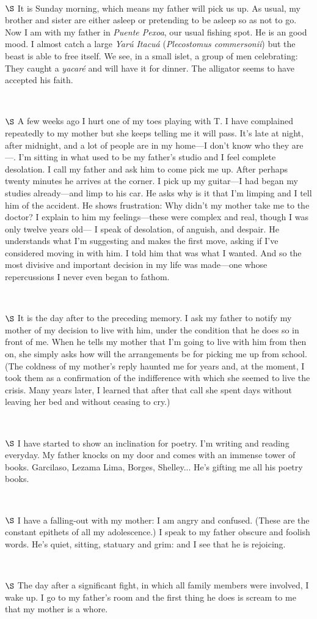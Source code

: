 \documentclass[a4paper, 12pt]{article}
\begin{document}
~

$\S$ It is Sunday morning, which means my father will pick us up. As usual, my
brother and sister are either asleep or pretending to be asleep so as not to
go. Now I am with my father in \textit{Puente Pexoa}, our usual
fishing spot. He is an good mood. I almost catch a large \textit{Yarú Itacuá}
(\textit{Plecostomus commersonii}) but the beast is able to free itself. We
see, in a small islet, a group of men celebrating: They caught a
\textit{yacaré} and will have it for dinner. The alligator seems to
have accepted his faith.

~ 

$\S$ A few weeks ago I hurt one of my toes playing with T. I have complained
repeatedly to my mother but she keeps telling me it will pass. It's late at
night, after midnight, and a lot of people are in my home---I don't know who
they are---. I'm sitting in what used to be my father's studio and I feel
complete desolation. I call my father and ask him to come pick me up. After
perhaps twenty minutes he arrives at the corner. I pick up
my guitar---I had began my studies already---and limp to his car. He asks why
is it that I'm limping and I tell him of the accident. He shows frustration: Why didn't my mother take me to the doctor? I explain to him my
feelings---these were complex and real, though I was only twelve years old--- I
speak of desolation, of anguish, and despair. He understands what I'm
suggesting and makes the first move, asking if I've considered moving in with
him. I told him that was what I wanted. And so the most divisive and important
decision in my life was made---one whose repercussions I never even began to
fathom.

~ 

$\S$ It is the day after to the preceding memory. I ask my father to notify my
mother of my decision to live with him, under the condition that he does so in
front of me. When he tells my mother that I'm going to live with him from then
on, she simply asks how will the arrangements be for picking me up from school.
(The coldness of my mother's reply haunted me for years and, at the moment, I
took them as a confirmation of the indifference with which she seemed to live
the crisis. Many years later, I learned that after that call she spent days
without leaving her bed and without ceasing to cry.)

~ 

$\S$ I have started to show an inclination for poetry. I'm writing and reading
everyday. My father knocks on my door and comes with an immense tower of books.
Garcilaso, Lezama Lima, Borges, Shelley... He's gifting me all his poetry
books.

~ 

$\S$ I have a falling-out with my mother: I am angry and confused. (These are
the constant epithets of all my adolescence.) I speak to my father obscure and
foolish words. He's quiet, sitting, statuary and grim: and I see that he is
rejoicing.

~ 

$\S$ The day after a significant fight, in which all family members were
involved, I wake up. I go to my father's room and the first thing he does is
scream to me that my mother is a whore.
\end{document}
